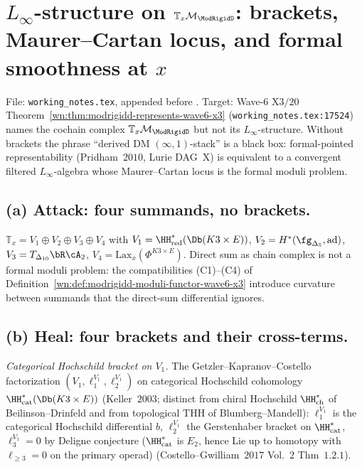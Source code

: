 \section{$L_\infty$-structure on $\mathbb T_x\mathcal M_{\ModRigidD}$: brackets, Maurer--Cartan locus, and formal smoothness at $x$}
\label{wn:sec:gelfand-manin-wave7-a1-linfty-tangent}

\providecommand{\MC}{\mathrm{MC}}
\providecommand{\Lax}{\mathrm{Lax}}
\providecommand{\dR}{\mathrm{dR}}
\providecommand{\ad}{\mathrm{ad}}
\providecommand{\GR}{\mathrm{GR}}

File: \texttt{working\_notes.tex}, appended before
\verb||. Target: Wave-$6$ X$3/20$
Theorem~\ref{wn:thm:modrigidd-represents-wave6-x3}
(\texttt{working\_notes.tex:17524}) names the cochain complex
$\mathbb T_x\mathcal M_{\ModRigidD}$ but not its
$L_\infty$-structure. Without brackets the phrase ``derived
DM $(\infty,1)$-stack'' is a black box: formal-pointed
representability (Pridham~$2010$, Lurie DAG~X) is equivalent to
a convergent filtered $L_\infty$-algebra whose Maurer--Cartan
locus is the formal moduli problem.

\subsection*{(a) Attack: four summands, no brackets.}

$\mathbb T_x=V_1\oplus V_2\oplus V_3\oplus V_4$ with
$V_1=\HH^*_{\mathrm{red}}(\Db(K3\times E))$,
$V_2=H^*(\fg_{\Delta_5},\ad)$, $V_3=T_{\Delta_{10}}\bR\cA_2$,
$V_4=\Lax_x(\Phi^{K3\times E})$. Direct sum as chain complex is
not a formal moduli problem: the compatibilities (C1)--(C4) of
Definition~\ref{wn:def:modrigidd-moduli-functor-wave6-x3}
introduce curvature between summands that the direct-sum
differential ignores.

\subsection*{(b) Heal: four brackets and their cross-terms.}

\emph{Categorical Hochschild bracket on $V_1$.} The
Getzler--Kapranov--Costello factorization
$(V_1,\ell_1^{V_1},\ell_2^{V_1})$ on categorical Hochschild
cohomology $\HH^*_{\mathrm{cat}}(\Db(K3\times E))$ (Keller~$2003$;
distinct from chiral Hochschild $\HH^*_{\mathrm{ch}}$ of
Beilinson--Drinfeld and from topological $\mathrm{THH}$ of
Blumberg--Mandell): $\ell_1^{V_1}$ is the categorical Hochschild
differential $b$, $\ell_2^{V_1}$ the Gerstenhaber bracket on
$\HH^*_{\mathrm{cat}}$, $\ell_3^{V_1}=0$ by Deligne conjecture
($\HH^*_{\mathrm{cat}}$ is $E_2$, hence Lie up to homotopy with
$\ell_{\geq 3}=0$ on the primary operad) (Costello--Gwilliam~$2017$
Vol.~$2$ Thm~$1.2.1$).

